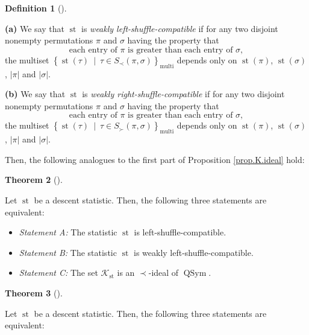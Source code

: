 \documentclass[numbers=enddot,12pt,final,onecolumn,notitlepage]{scrartcl}%
\theoremstyle{definition}
\newtheorem{theo}{Theorem}[section]
\newenvironment{theorem}[1][]
{\begin{theo}[#1]\begin{leftbar}}
{\end{leftbar}\end{theo}}
\newtheorem{defi}[theo]{Definition}
\newenvironment{definition}[1][]
{\begin{defi}[#1]\begin{leftbar}}
{\end{leftbar}\end{defi}}
\newenvironment{verlong}{}{}
\begin{document}
\begin{verlong}
\begin{definition}
\textbf{(a)} We say that $\operatorname*{st}$ is \textit{weakly
left-shuffle-compatible} if for any two disjoint nonempty permutations $\pi$
and $\sigma$ having the property that%
\begin{equation}
\text{each entry of }\pi\text{ is greater than each entry of }\sigma,
\label{eq.def.dendri.dsc.weak-ass}%
\end{equation}
the multiset $\left\{  \operatorname*{st}\left(  \tau\right)  \ \mid\ \tau\in
S_{\prec}\left(  \pi,\sigma\right)  \right\}  _{\operatorname*{multi}}$
depends only on $\operatorname*{st}\left(  \pi\right)  $, $\operatorname*{st}%
\left(  \sigma\right)  $, $\left\vert \pi\right\vert $ and $\left\vert
\sigma\right\vert $.

\textbf{(b)} We say that $\operatorname*{st}$ is \textit{weakly
right-shuffle-compatible} if for any two disjoint nonempty permutations $\pi$
and $\sigma$ having the property that%
\[
\text{each entry of }\pi\text{ is greater than each entry of }\sigma,
\]
the multiset $\left\{  \operatorname*{st}\left(  \tau\right)  \ \mid\ \tau\in
S_{\succ}\left(  \pi,\sigma\right)  \right\}  _{\operatorname*{multi}}$
depends only on $\operatorname*{st}\left(  \pi\right)  $, $\operatorname*{st}%
\left(  \sigma\right)  $, $\left\vert \pi\right\vert $ and $\left\vert
\sigma\right\vert $.
\end{definition}

Then, the following analogues to the first part of Proposition
\ref{prop.K.ideal} hold:

\begin{theorem}
\label{thm.dendri.K.ideal}Let $\operatorname*{st}$ be a descent statistic.
Then, the following three statements are equivalent:

\begin{itemize}
\item \textit{Statement A:} The statistic $\operatorname*{st}$ is left-shuffle-compatible.

\item \textit{Statement B:} The statistic $\operatorname*{st}$ is weakly left-shuffle-compatible.

\item \textit{Statement C:} The set $\mathcal{K}_{\operatorname*{st}}$ is an
$\left.  \prec\right.  $-ideal of $\operatorname*{QSym}$.
\end{itemize}
\end{theorem}

\begin{theorem}
\label{thm.dendri.K.ideal-R}Let $\operatorname*{st}$ be a descent statistic.
Then, the following three statements are equivalent:


\end{theorem}
\end{verlong}
\end{document}
